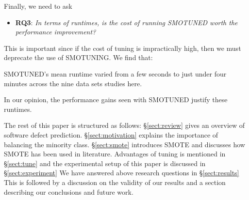 \documentclass[10pt,conference]{IEEEtran}
\newcommand{\bi}{\begin{itemize}[leftmargin=0.4cm]}
\newcommand{\ei}{\end{itemize}}
\newcommand{\be}{\begin{enumerate}}
\newcommand{\ee}{\end{enumerate}}
\theoremstyle{break}
\theoremstyle{break}
\newcommand{\tion}[1]{{\S}\ref{sect:#1}}
\begin{document}
  Finally, we need to ask
   \bi
  \item
  \textbf{RQ3}: {\em  In terms of runtimes, is the cost of running SMOTUNED worth the performance improvement?}
  \ei
  This is important since if the cost
  of tuning is impractically high, then
  we must deprecate the use of SMOTUNING.  We find that:
   \begin{lesson}SMOTUNED's mean runtime
   varied from a few seconds to just under
   four minutes   across 
   the nine data sets studies here.
 \end{lesson}
In our opinion, the performance gains seen with SMOTUNED justify these runtimes.  




 



The rest of this paper is structured as follows:
\tion{review} gives an overview of software defect prediction. \tion{motivation} explains the importance of balancing the minority class.
\tion{smote} introduces SMOTE and discusses how SMOTE has been used in literature. Advantages
of tuning is mentioned in \tion{tune}
and the experimental setup of this paper is discussed in \tion{experiment}
We have answered above research questions in
\tion{results} This is followed by a discussion on the validity of our results 
and a section describing our conclusions and future work.
\end{document}
